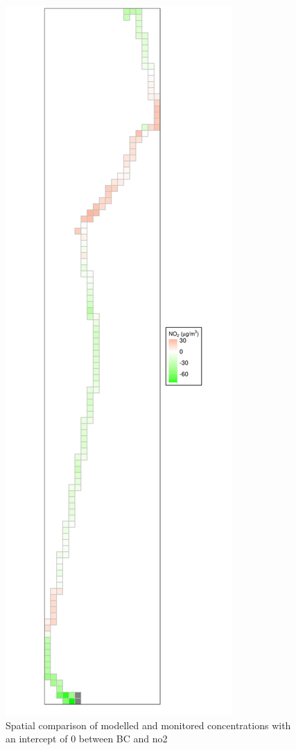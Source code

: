 \begin{figure}[H]
\centering
\includegraphics[scale=0.2]{images/monitored_minus_cmaq_route_cells_concs_zero_intercept.png}
\caption{Spatial comparison of modelled and monitored concentrations with an intercept of 0 between BC and \gls{no2}}
\label{fig:monitored_minus_cmaq_route_cells_concs_zero_intercept}
\end{figure}

